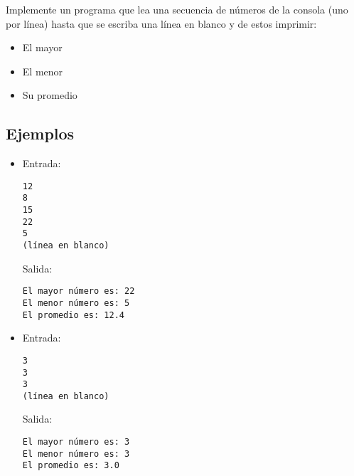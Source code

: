 Implemente un programa que lea una secuencia de números de la consola (uno por línea) hasta que se escriba una línea en blanco y de estos imprimir:
\begin{itemize}
    \item El mayor
    \item El menor
    \item Su promedio
\end{itemize}

\subsection*{Ejemplos}
\begin{itemize}
    \item Entrada:
\begin{verbatim}
12
8
15
22
5
(línea en blanco)
\end{verbatim}
    Salida:
\begin{verbatim}
El mayor número es: 22
El menor número es: 5
El promedio es: 12.4
\end{verbatim}

    \item Entrada:
\begin{verbatim}
3
3
3
(línea en blanco)
\end{verbatim}
    Salida:
\begin{verbatim}
El mayor número es: 3
El menor número es: 3
El promedio es: 3.0
\end{verbatim}
\end{itemize}
